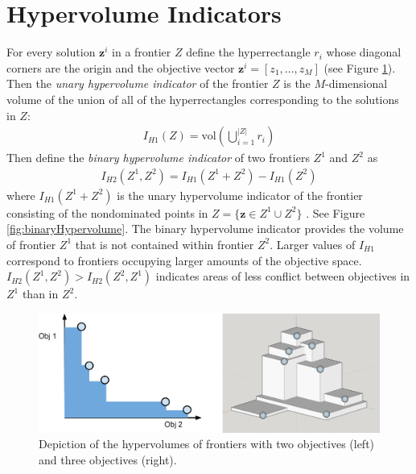 \section{Hypervolume Indicators}
\label{sec:hypervolumeIndicator}
For every solution $\mathbf{z}^i$ in a frontier $Z$ define the hyperrectangle $r_i$ whose diagonal corners are the origin and the objective vector $\mathbf{z}^i = [z_1,\ldots,z_M]$ (see Figure \ref{fig:frontierVolumes}). Then the \textit{unary hypervolume indicator} of the frontier $Z$ is the $M$-dimensional volume of the union of all of the hyperrectangles corresponding to the solutions in $Z$:
\begin{align}
I_{H1} (Z) = \text{vol} \left( \bigcup_{i = 1}^{|Z|} r_i \right) \label{eqn:hypervol}
\end{align}
Then define the \textit{binary hypervolume indicator} of two frontiers $Z^1$ and $Z^2$ as \cite{zitzler1999evolutionary}
\begin{align}
I_{H2} (Z^1,Z^2) = I_{H1} (Z^1 + Z^2) - I_{H1} (Z^2)
\end{align}
where $I_{H1} (Z^1 + Z^2)$ is the unary hypervolume indicator of the frontier consisting of the nondominated points in $Z = \{\mathbf{z} \in Z^1 \cup Z^2\}$ . See Figure \ref{fig:binaryHypervolume}. The binary hypervolume indicator provides the volume of frontier $Z^1$ that is not contained within frontier $Z^2$. Larger values of $I_{H1}$ correspond to frontiers occupying larger amounts of the objective space. $I_{H2}(Z^1, Z^2) > I_{H2}(Z^2, Z^1)$ indicates areas of less conflict between objectives in $Z^1$ than in $Z^2$.

\begin{figure}[ht]
\centering
\includegraphics[width=.85\textwidth]{../images/FrontierVolumesNo2DOutlines}
\caption[Hypervolume of Pareto frontiers]{Depiction of the hypervolumes of frontiers with two objectives (left) and three objectives (right).}
\label{fig:frontierVolumes}
\end{figure}

